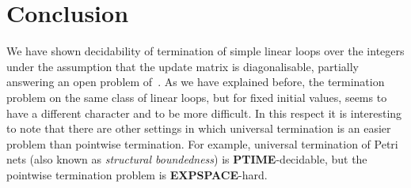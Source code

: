 \section{Conclusion}





We have shown decidability of termination of simple linear loops over
the integers under the assumption that the update matrix is
diagonalisable, partially answering an open problem
of~\cite{Tiw04,Bra06}.  As we have explained before, the termination
problem on the same class of linear loops, but for fixed initial
values, seems to have a different character and to be more difficult.
In this respect it is interesting to note that there are other
settings in which universal termination is an easier problem than
pointwise termination. For example, universal termination of Petri
nets (also known as \textit{structural boundedness}) is
\textbf{PTIME}-decidable, but the pointwise termination problem is
\textbf{EXPSPACE}-hard.

